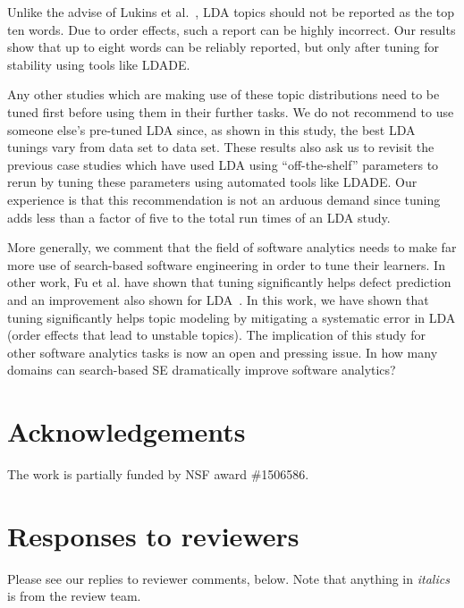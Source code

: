 \documentclass[twocolumn,5p,sort&compress]{elsarticle}
\theoremstyle{break}
\begin{document}
Unlike the advise of Lukins et al.~\cite{lukins2010bug}, LDA topics should not be reported as the top ten words.
  Due to order effects, such a report can be highly incorrect.
  Our results show that up to eight words can be reliably reported, but only
  after tuning for stability using tools like LDADE.

Any other studies which are making use of these topic distributions need to be tuned first before using them in their further tasks. We do not recommend to use someone else's pre-tuned LDA since, as shown in this study,  the best LDA tunings vary from data set to data set. These results also ask us to revisit the previous case studies which have used LDA using ``off-the-shelf'' parameters to rerun by tuning these parameters using automated tools like LDADE. Our experience is that this recommendation is not an arduous demand since tuning adds less than a factor of five to the total run times of an LDA study.

More generally, we comment that the field of software analytics needs to make far more use of search-based software engineering in order
to tune their learners. In other work, Fu et al. have shown that tuning significantly helps defect prediction~\cite{fu2016tuning} and an improvement also shown for LDA~\cite{panichella2013effectively}. In this work, we have shown that tuning significantly helps topic modeling by mitigating a systematic error in LDA  (order effects that lead to unstable topics). The implication of this study for other software analytics tasks is now an open
and pressing issue. 
In how many domains can search-based SE dramatically improve software analytics?


\section*{Acknowledgements}
		The work is partially funded by NSF award \#1506586.
	
\balance

\medskip




\clearpage
{}
\setcounter{page}{1}

\nobalance
\pagestyle{plain} 

\section*{Responses to reviewers}

Please see our replies to reviewer comments, below. Note that anything in {\em italics} is from the review team.\\
\end{document}
